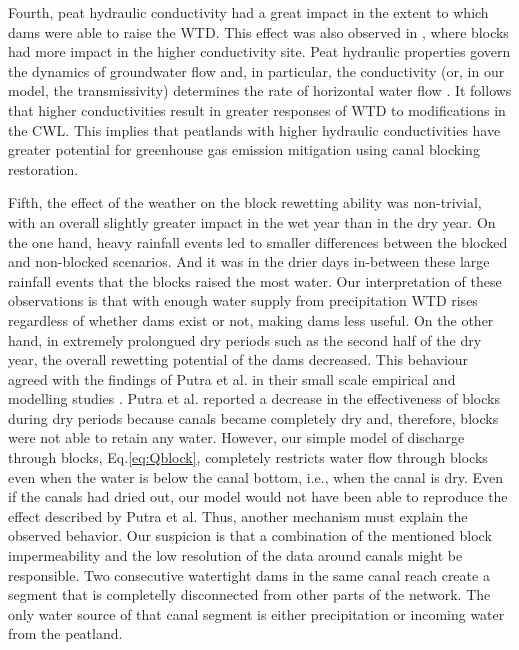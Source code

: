 \documentclass[bg, manuscript]{copernicus}
\begin{document}
Fourth, peat hydraulic conductivity had a great impact in the extent to which dams were able to raise the WTD.
This effect was also observed in \cite{putraModellingPerformanceBunds2022}, where blocks had more impact in the higher conductivity site.
Peat hydraulic properties govern the dynamics of groundwater flow and, in particular, the conductivity (or, in our model, the transmissivity) determines the rate of horizontal water flow \citep{hillelEnvironmentalSoilPhysics1998, bearModelingGroundwaterFlow2010}.
It follows that higher conductivities result in greater responses of WTD to modifications in the CWL.
This implies that peatlands with higher hydraulic conductivities have greater potential for greenhouse gas emission mitigation using canal blocking restoration.

Fifth, the effect of the weather on the block rewetting ability was non-trivial, with an overall slightly greater impact in the wet year than in the dry year.
On the one hand, heavy rainfall events led to smaller differences between the blocked and non-blocked scenarios.
And it was in the drier days in-between these large rainfall events that the blocks raised the most water.
Our interpretation of these observations is that with enough water supply from precipitation WTD rises regardless of whether dams exist or not, making dams less useful.
On the other hand, in extremely prolongued dry periods such as the second half of the dry year, the overall rewetting potential of the dams decreased.
This behaviour agreed with the findings of Putra et al. in their small scale empirical and modelling studies \citep{putraEffectsDitchDams2021, putraModellingPerformanceBunds2022}.
Putra et al. reported a decrease in the effectiveness of blocks during dry periods because canals became completely dry and, therefore, blocks were not able to retain any water.
However, our simple model of discharge through blocks, Eq.\eqref{eq:Qblock}, completely restricts water flow through blocks even when the water is below the canal bottom, i.e., when the canal is dry.
Even if the canals had dried out, our model would not have been able to reproduce the effect described by Putra et al.
Thus, another mechanism must explain the observed behavior.
Our suspicion is that a combination of the mentioned block impermeability and the low resolution of the data around canals might be responsible.
Two consecutive watertight dams in the same canal reach create a segment that is completelly disconnected from other parts of the network.
The only water source of that canal segment is either precipitation or incoming water from the peatland.
\end{document}
